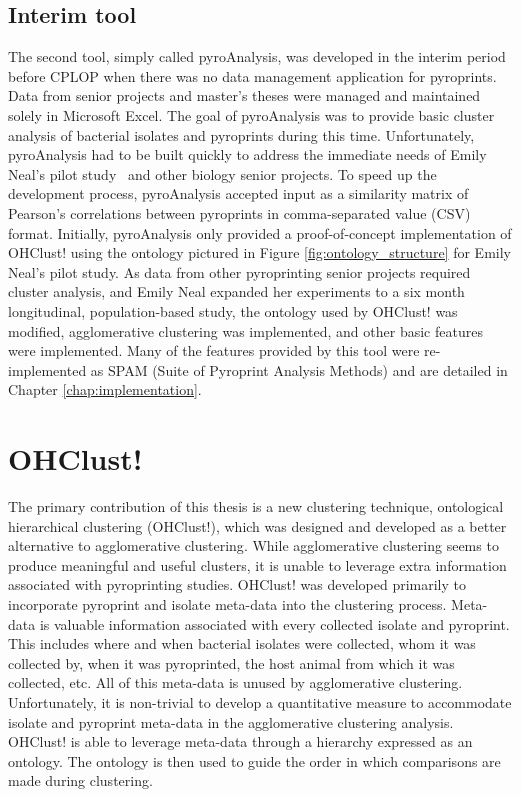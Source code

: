 \documentclass[12pt]{ucthesis}
\begin{document}
   \section{Interim tool}\label{sec:interim_tool}
      The second tool, simply called pyroAnalysis, was developed in the interim
      period before CPLOP when there was no data management application for
      pyroprints. Data from senior projects and master's theses were managed
      and maintained solely in Microsoft Excel. The goal of pyroAnalysis was to
      provide basic cluster analysis of bacterial isolates and pyroprints
      during this time. Unfortunately, pyroAnalysis had to be built quickly to
      address the immediate needs of Emily Neal's pilot
      study~\cite{Montana:ChronoCluster} and other biology senior
      projects. To speed up the development process, pyroAnalysis accepted
      input as a similarity matrix of Pearson's correlations between pyroprints
      in comma-separated value (CSV) format. Initially, pyroAnalysis only
      provided a proof-of-concept implementation of \textsf{OHClust!} using the
      ontology pictured in Figure \ref{fig:ontology_structure} for Emily Neal's
      pilot study. As data from other pyroprinting senior projects required
      cluster analysis, and Emily Neal expanded her experiments to a six month
      longitudinal, population-based study, the ontology used by
      \textsf{OHClust!} was modified, \textsf{agglomerative clustering} was
      implemented, and other basic features were implemented. Many of the
      features provided by this tool were re-implemented as SPAM (Suite of
      Pyroprint Analysis Methods) and are detailed in Chapter
      \ref{chap:implementation}.

\chapter{OHClust!}\label{chap:algorithm}
   The primary contribution of this thesis is a new clustering technique,
   \textsf{ontological hierarchical clustering} (\textsf{OHClust!}), which was
   designed and developed as a better alternative to \textsf{agglomerative
   clustering}. While \textsf{agglomerative clustering} seems to produce
   meaningful and useful clusters, it is unable to leverage extra information
   associated with pyroprinting studies. \textsf{OHClust!} was developed
   primarily to incorporate pyroprint and isolate meta-data into the clustering
   process. Meta-data is valuable information associated with every collected
   isolate and pyroprint. This includes where and when bacterial isolates were
   collected, whom it was collected by, when it was pyroprinted, the host
   animal from which it was collected, etc. All of this meta-data is unused by
   \textsf{agglomerative clustering}. Unfortunately, it is non-trivial to
   develop a quantitative measure to accommodate isolate and pyroprint
   meta-data in the \textsf{agglomerative clustering} analysis.
   \textsf{OHClust!} is able to leverage meta-data through a hierarchy
   expressed as an ontology. The ontology is then used to guide the order in
   which comparisons are made during clustering.
\end{document}
